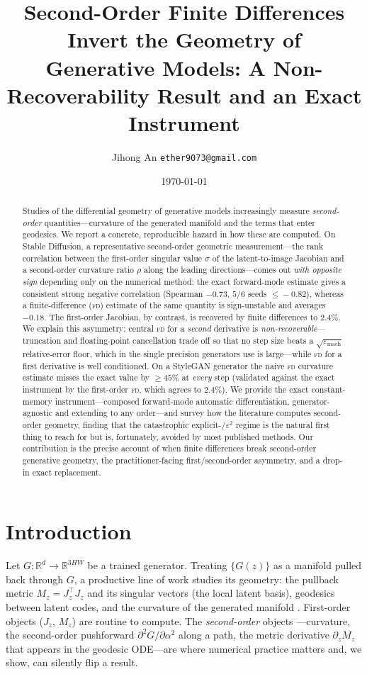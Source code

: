 \documentclass[11pt]{article}
\title{\vspace{-2em}Second-Order Finite Differences Invert the Geometry of\\
Generative Models: A Non-Recoverability Result and an Exact Instrument}
\author{Jihong An \quad\texttt{ether9073@gmail.com}}
\date{\today}
\newcommand{\R}{\mathbb{R}}
\newcommand{\fd}{\textsc{fd}}
\newcommand{\eps}{\varepsilon}
\begin{document}
\maketitle

\begin{abstract}
Studies of the differential geometry of generative models increasingly measure
\emph{second-order} quantities---curvature of the generated manifold and the
terms that enter geodesics. We report a concrete, reproducible hazard in how
these are computed. On Stable Diffusion, a representative second-order geometric
measurement---the rank correlation between the first-order singular value
$\sigma$ of the latent-to-image Jacobian and a second-order curvature ratio
$\rho$ along the leading directions---comes out \emph{with opposite sign}
depending only on the numerical method: the exact forward-mode estimate gives a
consistent strong negative correlation (Spearman $-0.73$, $5/6$ seeds
$\leq\!-0.82$), whereas a finite-difference (\fd) estimate of the same quantity
is sign-unstable and averages $-0.18$. The first-order Jacobian, by contrast, is
recovered by finite differences to $2.4\%$. We explain this asymmetry: central
\fd{} for a \emph{second} derivative is \emph{non-recoverable}---truncation and
floating-point cancellation trade off so that no step size beats a
$\sqrt{\eps_{\mathrm{mach}}}$ relative-error floor, which in the single precision
generators use is large---while \fd{} for a first derivative is well conditioned.
On a StyleGAN generator the naive \fd{} curvature estimate misses the exact
value by $\geq\!45\%$ at \emph{every} step (validated against the exact instrument
by the first-order \fd, which agrees to $2.4\%$). We provide the exact
constant-memory instrument---composed forward-mode automatic differentiation,
generator-agnostic and extending to any order---and survey how the literature
computes second-order geometry, finding that the catastrophic explicit-$/\eps^2$
regime is the natural first thing to reach for but is, fortunately, avoided by
most published methods. Our contribution is the precise account of when finite
differences break second-order generative geometry, the practitioner-facing
first/second-order asymmetry, and a drop-in exact replacement.
\end{abstract}

\section{Introduction}
Let $G:\R^{d}\to\R^{3HW}$ be a trained generator. Treating $\{G(z)\}$ as a
manifold pulled back through $G$, a productive line of work studies its geometry:
the pullback metric $M_z=J_z^\top J_z$ and its singular vectors (the local latent
basis), geodesics between latent codes, and the curvature of the generated
manifold \citep{arvanitidis2018,shao2018,chen2018,park2023,saito2025}. First-order
objects ($J_z$, $M_z$) are routine to compute. The \emph{second-order} objects
---curvature, the second-order pushforward $\partial^2 G/\partial\alpha^2$ along a
path, the metric derivative $\partial_z M_z$ that appears in the geodesic
ODE---are where numerical practice matters and, we show, can silently flip a
result.
\end{document}
